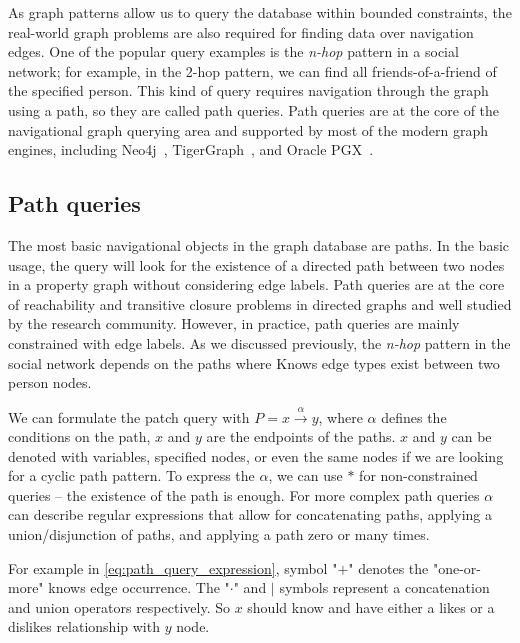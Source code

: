 As graph patterns allow us to query the database within bounded constraints, the real-world graph problems are also required for finding data over navigation edges.
One of the popular query examples is the \textit{n-hop} pattern in a social network; for example, in the 2-hop pattern, we can find all friends-of-a-friend of the specified person. 
This kind of query requires navigation through the graph using a path, so they are called path queries.
Path queries are at the core of the navigational graph querying area and supported by most of the modern graph engines, including Neo4j~\cite{neo4j_website}, TigerGraph~\cite{tigergraph_website}, and Oracle PGX~\cite{pgx_website}.

\subsection{Path queries}

The most basic navigational objects in the graph database are paths.
In the basic usage, the query will look for the existence of a directed path between two nodes in a property graph without considering edge labels.
Path queries are at the core of reachability and transitive closure problems in directed graphs and well studied by the research community.
However, in practice, path queries are mainly constrained with edge labels.
As we discussed previously, the \textit{n-hop} pattern in the social network depends on the paths where \textsf{Knows} edge types exist between two person nodes.


\begin{definition}\label{def:path_query}\cite{DBLP:journals/csur/AnglesABHRV17}

We can formulate the patch query with $P = x \xrightarrow{\alpha} y$, where $\alpha$ defines the conditions on the path, $x$ and $y$ are the endpoints of the paths.
$x$ and $y$ can be denoted with variables, specified nodes, or even the same nodes if we are looking for a cyclic path pattern.
To express the $\alpha$, we can use $*$ for non-constrained queries -- the existence of the path is enough.
For more complex path queries $\alpha$ can describe regular expressions that allow for concatenating paths, applying a union/disjunction of paths, and applying a path zero or many times.
  
\end{definition}

For example in \autoref{eq:path_query_expression}, symbol "$+$" denotes the "one-or-more" \textsf{knows} edge occurrence. 
The "$\cdot$" and $|$ symbols represent a concatenation and union operators respectively.
So $x$ should know and have either a \textsf{likes} or a \textsf{dislikes} relationship with $y$ node. 

